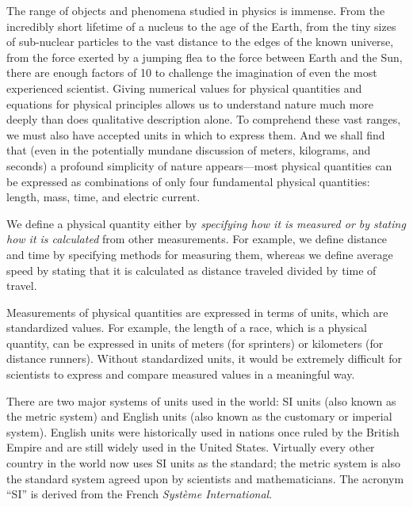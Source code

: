 \documentclass[main-ap-physics.tex]{subfiles}
\begin{document}
The range of objects and phenomena studied in physics is immense. From the incredibly short lifetime of a nucleus to the age of the Earth, from the tiny sizes of sub-nuclear particles to the vast distance to the edges of the known universe, from the force exerted by a jumping flea to the force between Earth and the Sun, there are enough factors of 10 to challenge the imagination of even the most experienced scientist. Giving numerical values for physical quantities and equations for physical principles allows us to understand nature much more deeply than does qualitative description alone. To comprehend these vast ranges, we must also have accepted units in which to express them. And we shall find that (even in the potentially mundane discussion of meters, kilograms, and seconds) a profound simplicity of nature appears---most physical quantities can be expressed as combinations of only four fundamental physical quantities: length, mass, time, and electric current.

\vspace{1em}

We define a \gls{physical quantity} either by \textit{specifying how it is measured or by stating how it is calculated} from other measurements. For example, we define distance and time by specifying methods for measuring them, whereas we define average speed by stating that it is calculated as distance traveled divided by time of travel.

\vspace{1em}

Measurements of physical quantities are expressed in terms of \gls{units}, which are standardized values. For example, the length of a race, which is a physical quantity, can be expressed in units of meters (for sprinters) or kilometers (for distance runners). Without standardized units, it would be extremely difficult for scientists to express and compare measured values in a meaningful way. 

\vspace{1em} %

There are two major systems of units used in the world: \gls{SI units} (also known as the metric system) and \gls{English units} (also known as the customary or imperial system). English units were historically used in nations once ruled by the British Empire and are still widely used in the United States. Virtually every other country in the world now uses SI units as the standard; the metric system is also the standard system agreed upon by scientists and mathematicians. The acronym ``SI'' is derived from the French \textit{Syst\`{e}me International}.
\end{document}
